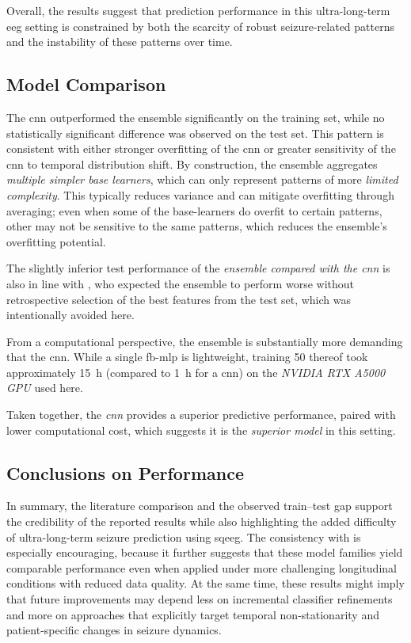 Overall, the results suggest that prediction performance in this ultra-long-term \gls{eeg} setting is constrained by both the scarcity of robust seizure-related patterns and the instability of these patterns over time.

\subsection{Model Comparison}\label{subsec:discussion-model-comparison}
The \gls{cnn} outperformed the ensemble significantly on the training set, while no statistically significant difference was observed on the test set.
This pattern is consistent with either stronger overfitting of the \gls{cnn} or greater sensitivity of the \gls{cnn} to temporal distribution shift.
By construction, the ensemble aggregates \textit{multiple simpler base learners}, which can only represent patterns of more \textit{limited complexity}.
This typically reduces variance and can mitigate overfitting through averaging; even when some of the base-learners do overfit to certain patterns, other may not be sensitive to the same patterns, which reduces the ensemble's overfitting potential.

The slightly inferior test performance of the \textit{ensemble compared with the \gls{cnn}} is also in line with \textcite{eberlein_evaluation_2019, muller_coherent_2022}, who expected the ensemble to perform worse without retrospective selection of the best features from the test set, which was intentionally avoided here.

From a computational perspective, the ensemble is substantially more demanding that the \gls{cnn}.
While a single \gls{fb-mlp} is lightweight, training 50 thereof took approximately \SI{15}{\hour} (compared to \SI{1}{\hour} for a \gls{cnn}) on the \textit{NVIDIA RTX A5000 GPU} used here.

Taken together, the \textit{\gls{cnn}} provides a superior predictive performance, paired with lower computational cost, which suggests it is the \textit{superior model} in this setting.

\subsection{Conclusions on Performance}
In summary, the literature comparison and the observed train--test gap support the credibility of the reported results while also highlighting the added difficulty of ultra-long-term seizure prediction using \gls{sqeeg}.
The consistency with \textcite{muller_coherent_2022} is especially encouraging, because it further suggests that these model families yield comparable performance even when applied under more challenging longitudinal conditions with reduced data quality.
At the same time, these results might imply that future improvements may depend less on incremental classifier refinements and more on approaches that explicitly target temporal non-stationarity and patient-specific changes in seizure dynamics.




